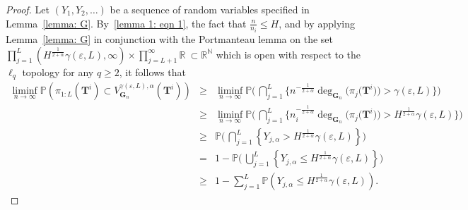 \documentclass[twoside,11pt]{article}
\theoremstyle{remark}
\begin{document}
\begin{proof}
Let $(Y_1, Y_2, \ldots )$ be a sequence of random variables specified in Lemma~\ref{lemma: G}.
By~\eqref{lemma 1: eqn 1}, the fact that $\frac{n}{n_i} \leq H$, and by applying Lemma~\ref{lemma: G} in conjunction with the Portmanteau lemma on the set $\prod_{j=1}^{L} \left(H^{\frac{1}{2+\alpha}}\gamma\left(\varepsilon, L\right),\infty\right)
   \times \prod_{j=L+1}^{\infty} \mathbb{R}
\ \subset \mathbb{R}^\mathbb{N}$ which is open with respect to the $\ell_q$ topology for any $q \geq 2$, it follows that
%
\begin{eqnarray}
   \label{lemma 1 eqn 2}
   \nonumber
   \liminf_{n \rightarrow \infty} \mathbb{P}\left(\pi_{1:L}\left(\boldsymbol{T}^i\right)\subset  V^{\gamma\left(\varepsilon, L\right), \alpha}_{\boldsymbol{G}_n}\left(\boldsymbol{T}^i\right)\right)&\geq& \liminf_{n \rightarrow \infty} \mathbb{P}\Biggl(\,\bigcap^L_{j=1}\biggl\{n^{-\frac{1}{2+\alpha}}\operatorname{deg}_{\boldsymbol{G}_n}\bigl(\pi_{j}\bigl(\boldsymbol{T}^i\bigr)\bigr) >  \gamma\left(\varepsilon, L\right) \biggr\}\Biggr)\\
   \nonumber
   &\geq & \liminf_{n \rightarrow \infty} \mathbb{P}\Biggl(\,\bigcap^L_{j=1}\biggl\{n_i^{-\frac{1}{2+\alpha}}\operatorname{deg}_{\boldsymbol{G}_n}\bigl(\pi_{j}\bigl(\boldsymbol{T}^i\bigr)\bigr) >  H^{\frac{1}{2+\alpha}}\gamma\left(\varepsilon, L\right) \biggr\}\Biggr)\\
   \nonumber
   &\geq &\mathbb{P}\Biggl(\,\bigcap^L_{j=1}\left\{Y_{j, \alpha} > H^{\frac{1}{2+\alpha}}\gamma\left(\varepsilon, L\right) \right\}\Biggr)\\
   \nonumber
   &=& 1- \mathbb{P}\Biggl(\, \bigcup^L_{j=1}\left\{Y_{j, \alpha} \leq H^{\frac{1}{2+\alpha}}\gamma\left(\varepsilon, L\right) \right\}\Biggr)\\
   &\ge &1-\sum^L_{j=1} \mathbb{P}\left(Y_{j, \alpha} \leq H^{\frac{1}{2+\alpha}}\gamma\left(\varepsilon, L\right) \right).
\end{eqnarray}
%
 

\end{proof}
\end{document}
